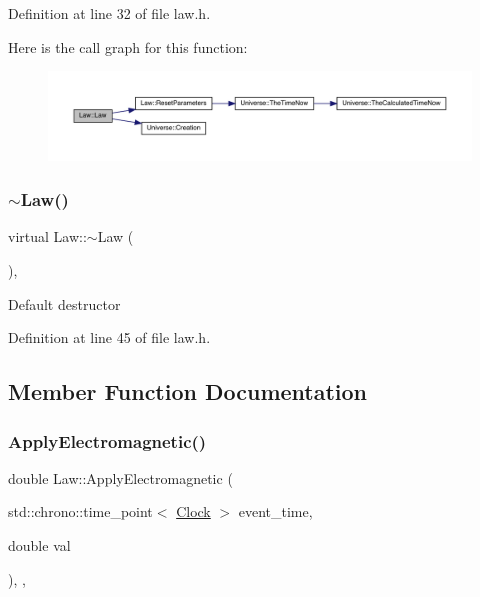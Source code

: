 Definition at line 32 of file law.\+h.

Here is the call graph for this function\+:\nopagebreak
\begin{figure}[H]
\begin{center}
\leavevmode
\includegraphics[width=350pt]{class_law_aa4fb7baf54aa77720605fd601fb80b8d_cgraph}
\end{center}
\end{figure}
\mbox{\label{class_law_a4fa6f0fb61285152c8c6d7a17b51a82b}} 
\subsubsection{\texorpdfstring{$\sim$\+Law()}{~Law()}}
{\footnotesize\ttfamily virtual Law\+::$\sim$\+Law (\begin{DoxyParamCaption}{ }\end{DoxyParamCaption})\hspace{0.3cm}{\ttfamily [inline]}, {\ttfamily [virtual]}}

Default destructor 

Definition at line 45 of file law.\+h.



\subsection{Member Function Documentation}
\mbox{\label{class_law_a418791aee2a9204a99d3a917b86fafd3}} 
\subsubsection{\texorpdfstring{Apply\+Electromagnetic()}{ApplyElectromagnetic()}}
{\footnotesize\ttfamily double Law\+::\+Apply\+Electromagnetic (\begin{DoxyParamCaption}\item[{std\+::chrono\+::time\+\_\+point$<$ \mbox{\hyperlink{universe_8h_a0ef8d951d1ca5ab3cfaf7ab4c7a6fd80}{Clock}} $>$}]{event\+\_\+time,  }\item[{double}]{val }\end{DoxyParamCaption})\hspace{0.3cm}{\ttfamily [inline]}, {\ttfamily [final]}, {\ttfamily [virtual]}}



